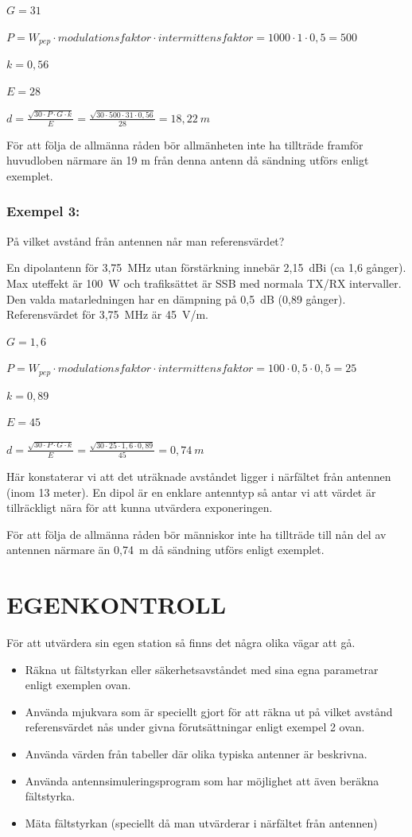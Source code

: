 \(G = 31\)

\(P = W_{pep} \cdot modulationsfaktor \cdot intermittensfaktor
= 1000 \cdot 1 \cdot 0,5 = 500\)

\(k = 0,56\)

\(E = 28\)

\(d = \frac{\sqrt{30 \cdot P \cdot G \cdot k}}{E}
= \frac{\sqrt{30 \cdot 500 \cdot 31 \cdot 0,56}}{28}
= 18,22\ m\)

För att följa de allmänna råden bör allmänheten inte ha tillträde framför
huvudloben närmare än 19 m från denna antenn då sändning utförs
enligt exemplet.

\subsubsection{Exempel 3:}

På vilket avstånd från antennen når man referensvärdet?

En dipolantenn för 3,75~MHz utan förstärkning innebär 2,15~dBi (ca 1,6 gånger).
Max uteffekt är 100~W och trafiksättet är SSB med normala TX/RX intervaller.
Den valda matarledningen har en dämpning på 0,5~dB (0,89 gånger).
Referensvärdet för 3,75~MHz är 45~V/m.

\(G = 1,6\)

\(P = W_{pep} \cdot modulationsfaktor \cdot intermittensfaktor
= 100 \cdot 0,5 \cdot 0,5 = 25\)

\(k = 0,89\)

\(E = 45\)

\(d = \frac{\sqrt{30 \cdot P \cdot G \cdot k}}{E} = \frac{\sqrt{30 \cdot 25 \cdot 1,6 \cdot 0,89}}{45}
= 0,74\ m\)

Här konstaterar vi att det uträknade avståndet ligger i närfältet från
antennen (inom 13 meter). En dipol är en enklare antenntyp så antar vi
att värdet är tillräckligt nära för att kunna utvärdera exponeringen.

För att följa de allmänna råden bör människor inte ha tillträde till
nån del av antennen närmare än 0,74~m då sändning utförs enligt exemplet.

\section{EGENKONTROLL}

För att utvärdera sin egen station så finns det några olika vägar att gå.

\begin{itemize}
\item Räkna ut fältstyrkan eller säkerhetsavståndet med sina egna
parametrar enligt exemplen ovan.
\item Använda mjukvara som är speciellt gjort för att räkna ut på
vilket avstånd referensvärdet nås under givna förutsättningar enligt
exempel 2 ovan.
\item Använda värden från tabeller där olika typiska antenner är beskrivna.
\item Använda antennsimuleringsprogram som har möjlighet att även
beräkna fältstyrka.
\item Mäta fältstyrkan (speciellt då man utvärderar i närfältet från antennen)
\end{itemize}

